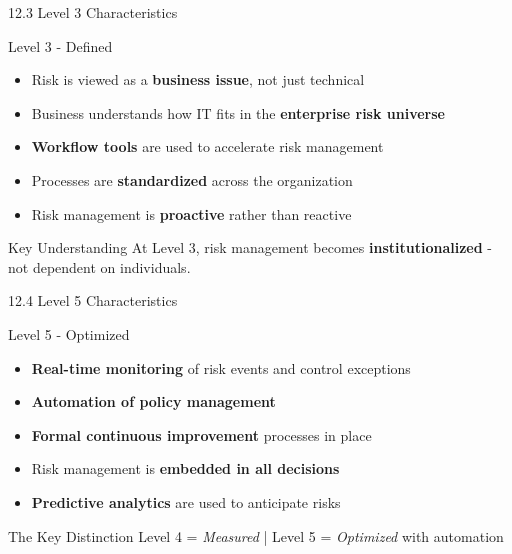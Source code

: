 \documentclass{beamer}
\begin{document}
	\begin{frame}{12.3 Level 3 Characteristics}
		\begin{block}{Level 3 - Defined}
			\begin{itemize}
				\item Risk is viewed as a \textbf{business issue}, not just technical
				\item Business understands how IT fits in the \textbf{enterprise risk universe}
				\item \textbf{Workflow tools} are used to accelerate risk management
				\item Processes are \textbf{standardized} across the organization
				\item Risk management is \textbf{proactive} rather than reactive
			\end{itemize}
		\end{block}
		
		\begin{exampleblock}{Key Understanding}
			At Level 3, risk management becomes \textbf{institutionalized} - not dependent on individuals.
		\end{exampleblock}
	\end{frame}
	
	\begin{frame}{12.4 Level 5 Characteristics}
		\begin{block}{Level 5 - Optimized}
			\begin{itemize}
				\item \textbf{Real-time monitoring} of risk events and control exceptions
				\item \textbf{Automation of policy management}
				\item \textbf{Formal continuous improvement} processes in place
				\item Risk management is \textbf{embedded in all decisions}
				\item \textbf{Predictive analytics} are used to anticipate risks
			\end{itemize}
		\end{block}
		
		\begin{alertblock}{The Key Distinction}
			Level 4 = \textit{Measured} | Level 5 = \textit{Optimized} with automation
		\end{alertblock}
	\end{frame}
	
\end{document}
